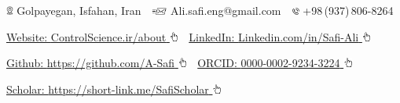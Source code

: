 \documentclass[letterpaper,MMMyyyy]{CVTemplate}
\newcommand{\CVAuthor}{Ali Safi}
\begin{document}
\centering
\Title{\CVAuthor} 
\begin{SubTitle}
{\includegraphics[height=8pt]{icons/locations.png} Golpayegan, Isfahan, Iran}
\,\SubBulletSymbol\,
{\includegraphics[height=7pt]{icons/SendEmail.png} Ali.safi.eng@gmail.com}
\,\SubBulletSymbol\,
\includegraphics[height=7pt]{icons/phone1.png}  +98\,(937)\,806-8264
\par
\href{https://www.controlscience.ir/about}{Website: \textcolor{Forestg}{ControlScience.ir/about} \includegraphics[height=9pt]{icons/hand-cursor.png}} 
\,\SubBulletSymbol\,
\href{https://www.linkedin.com/in/safi-ali}{LinkedIn: \textcolor{Forestg}{Linkedin.com/in/Safi-Ali} \includegraphics[height=9pt]{icons/hand-cursor.png}} 
\par
\href{https://github.com/A-Safi}{Github: \textcolor{Forestg}{https://github.com/A-Safi} \includegraphics[height=9pt]{icons/hand-cursor.png}} 
\,\SubBulletSymbol\,
\href{https://orcid.org/0000-0002-9234-3224}{ORCID: \textcolor{Forestg}{0000-0002-9234-3224} \includegraphics[height=9pt]{icons/hand-cursor.png}} 
\par
\href{https://short-link.me/SafiScholar}{Scholar: \textcolor{Forestg}{https://short-link.me/SafiScholar} \includegraphics[height=9pt]{icons/hand-cursor.png}}

\end{SubTitle}
\end{document}
